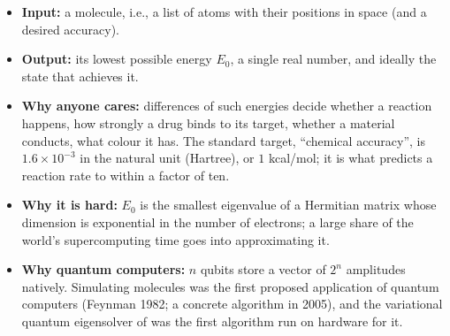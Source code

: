 \documentclass[handoutsbeamer.tex]{subfiles}
\begin{document}
\begin{frame}
\onp{\footnotesize}
\begin{itemize}\setlength\itemsep{0.3em}
    \item \textbf{Input:} a molecule, i.e., a list of atoms with their positions in space (and a desired accuracy).
    \item \textbf{Output:} its lowest possible energy $E_0$, a single real number, and ideally the state that achieves it.
    \item \textbf{Why anyone cares:} differences of such energies decide whether a reaction happens, how strongly a drug binds to its target, whether a material conducts, what colour it has. The standard target, ``chemical accuracy'', is $1.6\times10^{-3}$ in the natural unit (Hartree), or $1$ kcal/mol; it is what predicts a reaction rate to within a factor of ten.
    \item \textbf{Why it is hard:} $E_0$ is the smallest eigenvalue of a Hermitian matrix whose dimension is exponential in the number of electrons; a large share of the world's supercomputing time goes into approximating it.
    \item \textbf{Why quantum computers:} $n$ qubits store a vector of $2^n$ amplitudes natively. Simulating molecules was the first proposed application of quantum computers (Feynman 1982; a concrete algorithm in 2005), and the variational quantum eigensolver of \citet{peruzzo2014variational} was the first algorithm run on hardware for it.
\end{itemize}
\end{frame}
\end{document}
